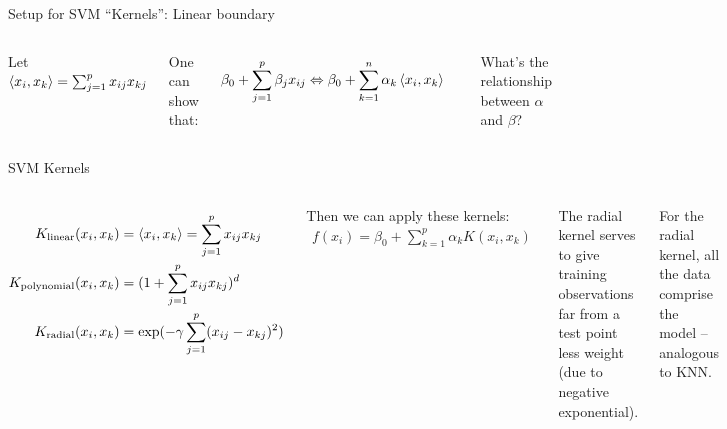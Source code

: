 \documentclass[mathserif, aspectratio=169]{beamer}
\begin{document}
\begin{frame}{Setup for SVM ``Kernels'': Linear boundary}



\begin{columns}
\vspace{10mm}

Let $\braket{x_i,x_k} = \sum_{j=1}^px_{ij}x_{kj}$

\vspace{5mm}

One can show that:

\begin{align*}
\beta_0 + \sum_{j=1}^p \beta_j x_{ij} &\Leftrightarrow \beta_0 + \sum_{k=1}^n \alpha_k \braket{x_i,x_k}
\end{align*}

\vspace{50mm}
What's the relationship between $\alpha$ and $\beta$?
\end{columns}
\end{frame}


\begin{frame}{SVM Kernels}
\begin{columns}

\begin{align*}
K_\text{linear}(x_i,x_k) &= \braket{x_i,x_k} = \sum_{j=1}^px_{ij}x_{kj}\\
K_\text{polynomial}(x_i,x_k) &= (1+ \sum_{j=1}^px_{ij}x_{kj})^d\\
K_\text{radial}(x_i,x_k) &= \exp(-\gamma \sum_{j=1}^p(x_{ij}-x_{kj})^2)\\
\end{align*}

Then we can apply these kernels:
\begin{align*}
f(x_i) = \beta_0+\sum_{k=1}^p \alpha_k K(x_i,x_k) 
\end{align*}

The radial kernel serves to give training observations far from a test point less weight (due to negative exponential). 

\vspace{5mm}

For the radial kernel, all the data comprise the model -- analogous to KNN.  
\end{columns}

\end{frame}
\end{document}
